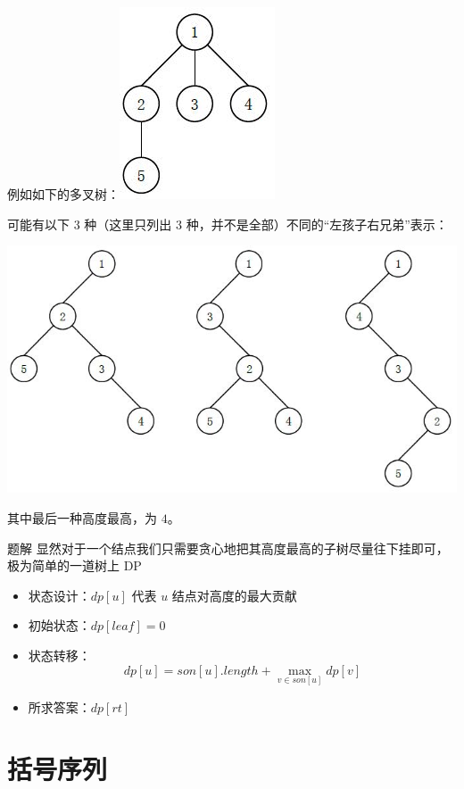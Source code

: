\documentclass{pptt}
\begin{document}
\begin{frame}
    例如如下的多叉树：\includegraphics[scale=0.4]{images/1.jpg}

    可能有以下 3 种（这里只列出 3 种，并不是全部）不同的“左孩子右兄弟”表示：

    \includegraphics[scale=0.4]{images/2.jpg}

    其中最后一种高度最高，为 $4$。
\end{frame}

\begin{frame}{题解}
    显然对于一个结点我们只需要贪心地把其高度最高的子树尽量往下挂即可，极为简单的一道树上 DP

    \begin{itemize}
        \item 状态设计：$dp[u]$ 代表 $u$ 结点对高度的最大贡献
        \item 初始状态：$dp[leaf]=0$
        \item 状态转移：$$dp[u]=son[u].length + \max_{v \in son[u]}dp[v]$$
        \item 所求答案：$dp[rt]$
    \end{itemize}
\end{frame}

\section{括号序列}
\end{document}

